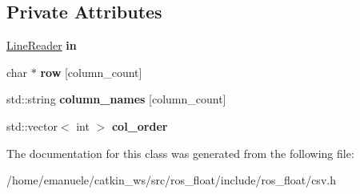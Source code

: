 \subsection*{Private Attributes}
\begin{DoxyCompactItemize}
\item 
\mbox{\label{classio_1_1CSVReader_a26da3892b5c4606617d9daadc0886501}} 
\hyperlink{classio_1_1LineReader}{Line\+Reader} {\bfseries in}
\item 
\mbox{\label{classio_1_1CSVReader_a48ab5773a4295f7969453838b4115e42}} 
char $\ast$ {\bfseries row} \mbox{[}column\+\_\+count\mbox{]}
\item 
\mbox{\label{classio_1_1CSVReader_a7b97f929cea543f83e61173ea435fdde}} 
std\+::string {\bfseries column\+\_\+names} \mbox{[}column\+\_\+count\mbox{]}
\item 
\mbox{\label{classio_1_1CSVReader_a1a59e51b74c2d6056821a5e499379884}} 
std\+::vector$<$ int $>$ {\bfseries col\+\_\+order}
\end{DoxyCompactItemize}


The documentation for this class was generated from the following file\+:\begin{DoxyCompactItemize}
\item 
/home/emanuele/catkin\+\_\+ws/src/ros\+\_\+float/include/ros\+\_\+float/csv.\+h\end{DoxyCompactItemize}
